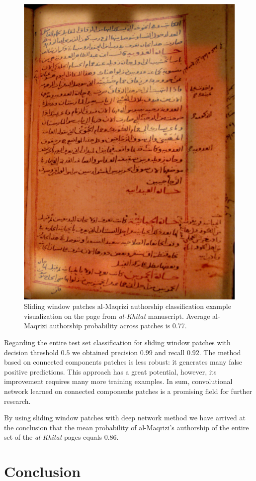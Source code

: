 \documentclass[conference,a4paper]{ieeetran}
\begin{document}
\begin{figure}[!t]
	\centering
  \includegraphics[width=0.49\linewidth]{figures/hitat_15_fixed.png}
   \caption{Sliding window patches al-Maqrizi authorship classification example visualization on the page from {\it al-Khitat} manuscript. Average al-Maqrizi authorship probability across patches is 0.77.}
	\label{fig:al_maqrizi_classification_example_test_hitat}
\end{figure}

Regarding the entire test set classification for sliding window patches with decision threshold $0.5$ we obtained precision $0.99$ and recall $0.92$. The method based on connected components patches is less robust: it generates many false positive predictions. This approach has a great potential, however, its improvement requires many more training examples. In sum, convolutional network learned on connected components patches is a promising field for further research.

By using sliding window patches with deep network method we have arrived at the conclusion that the mean probability of al-Maqrizi's authorship  of the entire set of the {\it al-Khitat} pages equals $0.86$.    

\section{Conclusion}
\end{document}
